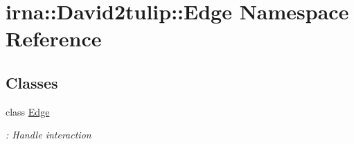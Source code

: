 \hypertarget{namespaceirna_1_1David2tulip_1_1Edge}{
\section{irna\-:\-:\-David2tulip\-:\-:\-Edge \-Namespace \-Reference}
\label{namespaceirna_1_1David2tulip_1_1Edge}
}
\subsection*{\-Classes}
\begin{DoxyCompactItemize}
\item 
class \hyperlink{classirna_1_1David2tulip_1_1Edge_1_1Edge}{\-Edge}
\begin{DoxyCompactList}\small\item\em \-: \-Handle interaction \end{DoxyCompactList}\end{DoxyCompactItemize}
